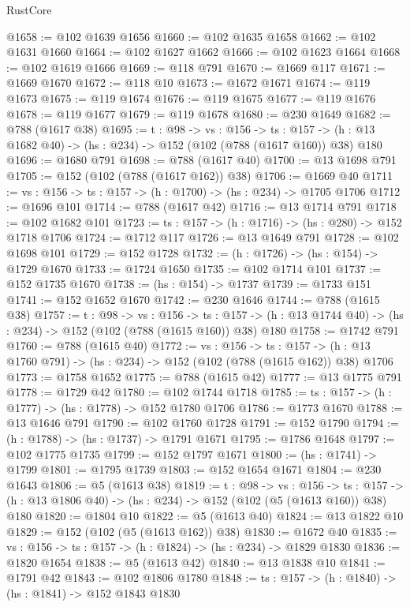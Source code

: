 \begin{lexlean}{RustCore}
\begin{coremodule}
@1658 := @102 @1639 @1656
@1660 := @102 @1635 @1658
@1662 := @102 @1631 @1660
@1664 := @102 @1627 @1662
@1666 := @102 @1623 @1664
@1668 := @102 @1619 @1666
@1669 := @118 @791
@1670 := @1669 @117
@1671 := @1669 @1670
@1672 := @118 @10
@1673 := @1672 @1671
@1674 := @119 @1673
@1675 := @119 @1674
@1676 := @119 @1675
@1677 := @119 @1676
@1678 := @119 @1677
@1679 := @119 @1678
@1680 := @230 @1649
@1682 := @788 (@1617 @38)
@1695 := {t : @98} ->
  {vs : @156} ->
  {ts : @157} -> (h : @13 @1682 @40) -> (hs : @234) -> @152 (@102 (@788 (@1617 @160)) @38) @180
@1696 := @1680 @791
@1698 := @788 (@1617 @40)
@1700 := @13 @1698 @791
@1705 := @152 (@102 (@788 (@1617 @162)) @38)
@1706 := @1669 @40
@1711 := {vs : @156} -> {ts : @157} -> (h : @1700) -> (hs : @234) -> @1705 @1706
@1712 := @1696 @101
@1714 := @788 (@1617 @42)
@1716 := @13 @1714 @791
@1718 := @102 @1682 @101
@1723 := {ts : @157} -> (h : @1716) -> (hs : @280) -> @152 @1718 @1706
@1724 := @1712 @117
@1726 := @13 @1649 @791
@1728 := @102 @1698 @101
@1729 := @152 @1728
@1732 := (h : @1726) -> (hs : @154) -> @1729 @1670
@1733 := @1724 @1650
@1735 := @102 @1714 @101
@1737 := @152 @1735 @1670
@1738 := (hs : @154) -> @1737
@1739 := @1733 @151
@1741 := @152 @1652 @1670
@1742 := @230 @1646
@1744 := @788 (@1615 @38)
@1757 := {t : @98} ->
  {vs : @156} ->
  {ts : @157} -> (h : @13 @1744 @40) -> (hs : @234) -> @152 (@102 (@788 (@1615 @160)) @38) @180
@1758 := @1742 @791
@1760 := @788 (@1615 @40)
@1772 := {vs : @156} ->
  {ts : @157} -> (h : @13 @1760 @791) -> (hs : @234) -> @152 (@102 (@788 (@1615 @162)) @38) @1706
@1773 := @1758 @1652
@1775 := @788 (@1615 @42)
@1777 := @13 @1775 @791
@1778 := @1729 @42
@1780 := @102 @1744 @1718
@1785 := {ts : @157} -> (h : @1777) -> (hs : @1778) -> @152 @1780 @1706
@1786 := @1773 @1670
@1788 := @13 @1646 @791
@1790 := @102 @1760 @1728
@1791 := @152 @1790
@1794 := (h : @1788) -> (hs : @1737) -> @1791 @1671
@1795 := @1786 @1648
@1797 := @102 @1775 @1735
@1799 := @152 @1797 @1671
@1800 := (hs : @1741) -> @1799
@1801 := @1795 @1739
@1803 := @152 @1654 @1671
@1804 := @230 @1643
@1806 := @5 (@1613 @38)
@1819 := {t : @98} ->
  {vs : @156} ->
  {ts : @157} -> (h : @13 @1806 @40) -> (hs : @234) -> @152 (@102 (@5 (@1613 @160)) @38) @180
@1820 := @1804 @10
@1822 := @5 (@1613 @40)
@1824 := @13 @1822 @10
@1829 := @152 (@102 (@5 (@1613 @162)) @38)
@1830 := @1672 @40
@1835 := {vs : @156} -> {ts : @157} -> (h : @1824) -> (hs : @234) -> @1829 @1830
@1836 := @1820 @1654
@1838 := @5 (@1613 @42)
@1840 := @13 @1838 @10
@1841 := @1791 @42
@1843 := @102 @1806 @1780
@1848 := {ts : @157} -> (h : @1840) -> (hs : @1841) -> @152 @1843 @1830

\end{coremodule}
\end{lexlean}

